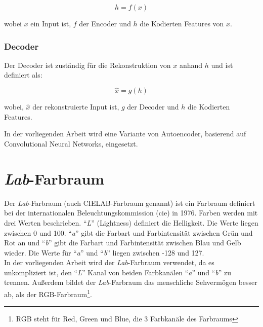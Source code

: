 \begin{equation}
  h = f(x)
\end{equation}

wobei $x$ ein Input ist, $f$ der Encoder und $h$ die Kodierten Features von $x$.

\subsubsection{Decoder}
Der Decoder ist zuständig für die Rekonstruktion von $x$ anhand $h$ und ist definiert als:

\begin{equation}
  \hat{x} = g(h)
\end{equation}

wobei, $\hat{x}$ der rekonstruierte Input ist, $g$ der Decoder und $h$ die Kodierten Features.

In der vorliegenden Arbeit wird eine Variante von Autoencoder, basierend auf Convolutional Neural Networks, eingesetzt.

\section{\textit{Lab}-Farbraum} 
Der \textit{Lab}-Farbraum (auch CIELAB-Farbraum genannt) ist ein Farbraum definiert bei der internationalen
Beleuchtungskommission (\gls{cie}) in 1976. Farben werden mit drei Werten beschrieben. ``\textit{L}'' (Lightness) definiert die Helligkeit.
Die Werte liegen zwischen 0 und 100. ``\textit{a}'' gibt die Farbart und Farbintensität zwischen Grün und Rot an und ``\textit{b}'' gibt die
Farbart und Farbintensität zwischen Blau und Gelb wieder. Die Werte für ``\textit{a}'' und ``\textit{b}'' liegen zwischen -128 und 127.
\\
In der vorliegenden Arbeit wird der \textit{Lab}-Farbraum verwendet, da es unkompliziert ist, den ``\textit{L}'' Kanal von beiden Farbkanälen
``\textit{a}'' und ``\textit{b}'' zu trennen. Außerdem bildet der \textit{Lab}-Farbraum das menschliche Sehvermögen besser ab, als der 
RGB-Farbraum\footnote{RGB steht für Red, Green und Blue, die 3 Farbkanäle des Farbraums}.

